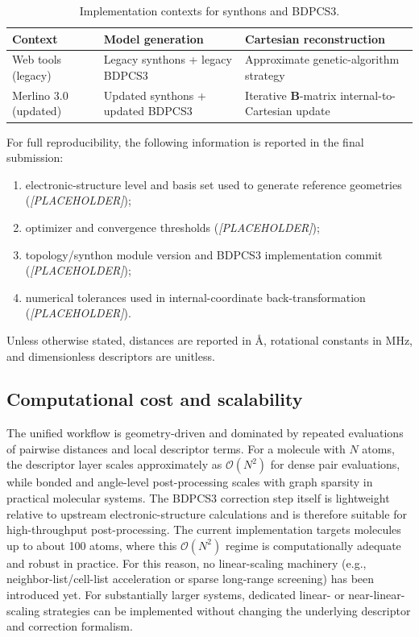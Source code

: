 \documentclass[journal=jctcce,manuscript=article]{achemso}
\begin{document}
\begin{table}[ht]
\caption{Implementation contexts for synthons and BDPCS3.}
\label{tab:impl_contexts}
\centering
\begin{tabular}{lll}
\toprule
Context & Model generation & Cartesian reconstruction \\
\midrule
Web tools (legacy) & Legacy synthons + legacy BDPCS3 & Approximate genetic-algorithm strategy \\
Merlino 3.0 (updated) & Updated synthons + updated BDPCS3 & Iterative $\mathbf{B}$-matrix internal-to-Cartesian update \\
\bottomrule
\end{tabular}
\end{table}

For full reproducibility, the following information is reported in the final submission:
\begin{enumerate}
\item electronic-structure level and basis set used to generate reference geometries (\textit{[PLACEHOLDER]});
\item optimizer and convergence thresholds (\textit{[PLACEHOLDER]});
\item topology/synthon module version and BDPCS3 implementation commit (\textit{[PLACEHOLDER]});
\item numerical tolerances used in internal-coordinate back-transformation (\textit{[PLACEHOLDER]}).
\end{enumerate}
Unless otherwise stated, distances are reported in \AA, rotational constants in MHz, and dimensionless descriptors are unitless.

\subsection{Computational cost and scalability}
The unified workflow is geometry-driven and dominated by repeated evaluations of pairwise distances and local descriptor terms. For a molecule with $N$ atoms, the descriptor layer scales approximately as $\mathcal{O}(N^2)$ for dense pair evaluations, while bonded and angle-level post-processing scales with graph sparsity in practical molecular systems. The BDPCS3 correction step itself is lightweight relative to upstream electronic-structure calculations and is therefore suitable for high-throughput post-processing.
The current implementation targets molecules up to about 100 atoms, where this $\mathcal{O}(N^2)$ regime is computationally adequate and robust in practice. For this reason, no linear-scaling machinery (e.g., neighbor-list/cell-list acceleration or sparse long-range screening) has been introduced yet. For substantially larger systems, dedicated linear- or near-linear-scaling strategies can be implemented without changing the underlying descriptor and correction formalism.
\end{document}
